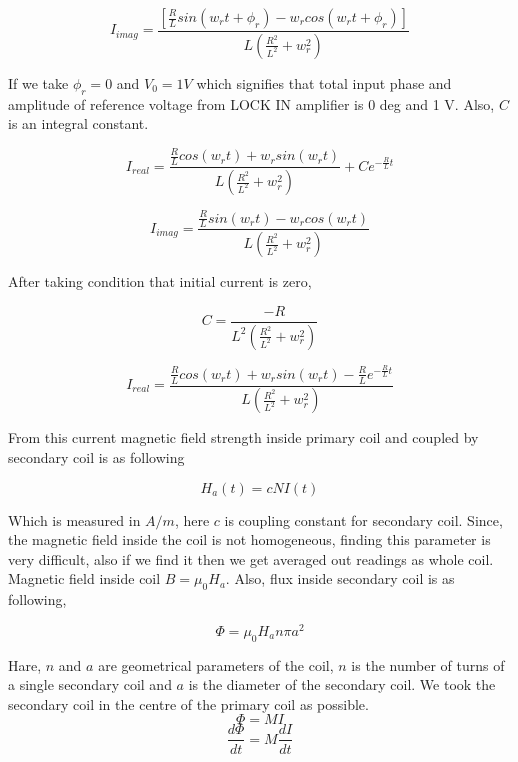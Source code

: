 \begin{equation}
I_{imag}=\frac{\left[\frac{R}{L} sin(w_rt+\phi_r)-w_r cos(w_rt+\phi_r)\right]}{L(\frac{R^2}{L^2}+w_r^2)}
\end{equation}

If we take $\phi_r = 0$ and $V_0 = 1 V$ which signifies that total input phase and amplitude of reference voltage from LOCK IN amplifier is 0 deg and 1 V. Also, $C$ is an integral constant.
 

\begin{equation}
I_{real} = \frac{\frac{R}{L} cos(w_rt)+w_r sin(w_rt)}{L(\frac{R^2}{L^2}+w_r^2)}+Ce^{-\frac{R}{L}t}
\end{equation}

\begin{equation}
I_{imag}=\frac{\frac{R}{L} sin(w_rt)-w_r cos(w_rt)}{L(\frac{R^2}{L^2}+w_r^2)}
\end{equation}

 After taking condition that initial current is zero, 

\begin{equation}
C = \frac{-R}{L^2(\frac{R^2}{L^2}+w_r^2)}
\end{equation}

\begin{equation}
I_{real} = \frac{\frac{R}{L} cos(w_rt)+w_r sin(w_rt) -\frac{R}{L}e^{-\frac{R}{L}t}}{L(\frac{R^2}{L^2}+w_r^2)}
\end{equation}

From this current magnetic field strength inside primary coil and coupled by secondary coil is as following

\begin{equation*}
H_a(t) = c N I(t)
\end{equation*}

Which is measured in $A/m$, here $c$ is coupling constant for secondary coil. Since, the magnetic field inside the coil is not homogeneous, finding this parameter is very difficult, also if we find it then we get averaged out readings as whole coil. Magnetic field inside coil $B=\mu_0 H_a$. Also, flux inside secondary coil is as following, 

\begin{equation*}
\Phi = \mu_0 H_a n \pi a^2
\end{equation*}

Hare, $n$ and $a$ are geometrical parameters of the coil, $n$ is the number of turns of a single secondary coil and $a$ is the diameter of the secondary coil. We took the secondary coil in the centre of the primary coil as possible.
\begin{equation*}
\Phi = M I
\end{equation*}
\begin{equation*}
\frac{d\Phi}{dt} = M \frac{dI}{dt}
\end{equation*}

